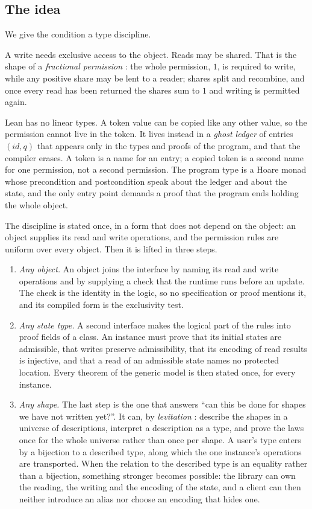 \documentclass[11pt,a4paper]{article}
\theoremstyle{definition}
\theoremstyle{plain}
\begin{document}
\subsection{The idea}

We give the condition a type discipline.

A write needs exclusive access to the object. Reads may be shared. That is the
shape of a \emph{fractional permission} \cite{boyland2003checking}: the whole
permission, $1$, is required to write, while any positive share may be lent to a
reader; shares split and recombine, and once every read has been returned the
shares sum to $1$ and writing is permitted again.

Lean has no linear types. A token value can be copied like any other value, so
the permission cannot live in the token. It lives instead in a \emph{ghost
ledger} of entries $(\mathit{id}, q)$ that appears only in the types and proofs
of the program, and that the compiler erases. A token is a name for an entry; a
copied token is a second name for one permission, not a second permission. The
program type is a Hoare monad whose precondition and postcondition speak about
the ledger and about the state, and the only entry point demands a proof that
the program ends holding the whole object.

The discipline is stated once, in a form that does not depend on the object: an
object supplies its read and write operations, and the permission rules are
uniform over every object. Then it is lifted in three steps.

\begin{enumerate}[leftmargin=1.4em,itemsep=2pt]
\item \emph{Any object.} An object joins the interface by naming its read and
write operations and by supplying a check that the runtime runs before an
update. The check is the identity in the logic, so no specification or proof
mentions it, and its compiled form is the exclusivity test.
\item \emph{Any state type.} A second interface makes the logical part of the
rules into proof fields of a class. An instance must prove that its initial
states are admissible, that writes preserve admissibility, that its encoding of
read results is injective, and that a read of an admissible state names no
protected location. Every theorem of the generic model is then stated once, for
every instance.
\item \emph{Any shape.} The last step is the one that answers ``can this be done
for shapes we have not written yet?''. It can, by \emph{levitation}
\cite{chapman2010levitation}: describe the shapes in a universe of
descriptions, interpret a description as a type, and prove the laws once for the
whole universe rather than once per shape. A user's type enters by a bijection
to a described type, along which the one instance's operations are transported.
When the relation to the described type is an equality rather than a bijection,
something stronger becomes possible: the library can own the reading, the
writing and the encoding of the state, and a client can then neither introduce
an alias nor choose an encoding that hides one.
\end{enumerate}
\end{document}
